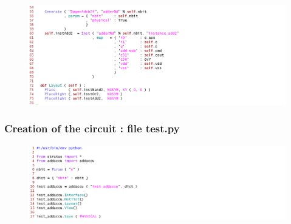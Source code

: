 \begin{figure}[h!]
\centering
{}
          {\includegraphics[width=1.4\textwidth]{./images/addaccu2.png}}
\end{figure}

\newpage
\subsubsection{Creation of the circuit : file test.py}

\begin{figure}[h!]
\centering
{}
          {\includegraphics[width=1.4\textwidth]{./images/test.png}}
\end{figure}

